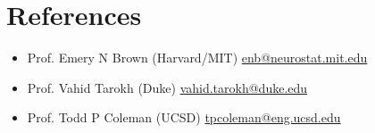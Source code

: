 \section*{References}

\begin{itemize}

    \item Prof. Emery N Brown (Harvard/MIT) \href{mailto:enb@neurostat.mit.edu}{enb@neurostat.mit.edu}


    
    \item Prof. Vahid Tarokh (Duke) \href{mailto:vahid.tarokh@duke.edu}{vahid.tarokh@duke.edu}


    \item Prof. Todd P Coleman (UCSD) \href{mailto:tpcoleman@eng.ucsd.edu}{tpcoleman@eng.ucsd.edu}
    
\end{itemize}
